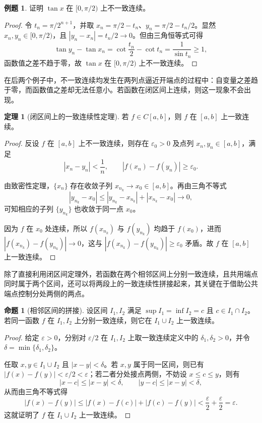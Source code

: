 \documentclass[UTF8,fontset=fandol,a4paper,12pt]{ctexart}
\theoremstyle{definition}
\newtheorem{theorem}[definition]{定理}
\newtheorem{proposition}[definition]{命题}
\newtheorem{example}[definition]{例题}
\begin{document}
\begin{example}
证明 $\tan x$ 在 $[0,\pi/2)$ 上不一致连续。
\end{example}
\begin{proof}
令 $t_n=\pi/2^{n+1}$，并取 $x_n=\pi/2-t_n$、$y_n=\pi/2-t_n/2$。显然 $x_n,y_n\in[0,\pi/2)$，且 $|y_n-x_n|=t_n/2\to0$。但由三角恒等式可得
\[
 \tan y_n-\tan x_n
 =\cot\frac{t_n}{2}-\cot t_n
 =\frac1{\sin t_n}\ge1,
\]
函数值之差不趋于零，故 $\tan x$ 在 $[0,\pi/2)$ 上不一致连续。
\end{proof}

在后两个例子中，不一致连续均发生在两列点逼近开端点的过程中：自变量之差趋于零，而函数值之差却无法任意小。若函数在闭区间上连续，则这一现象不会出现。

\begin{theorem}[闭区间上的一致连续性定理]
若 $f\in C[a,b]$，则 $f$ 在 $[a,b]$ 上一致连续。
\end{theorem}
\begin{proof}
反设 $f$ 在 $[a,b]$ 上不一致连续，则存在 $\varepsilon_0>0$ 及点列 $x_n,y_n\in[a,b]$，满足
\[
 |x_n-y_n|<\frac1n,\qquad |f(x_n)-f(y_n)|\ge\varepsilon_0.
\]

由致密性定理，$\{x_n\}$ 存在收敛子列 $x_{n_k}\to x_0\in[a,b]$。再由三角不等式
\[
 |y_{n_k}-x_0|\le|y_{n_k}-x_{n_k}|+|x_{n_k}-x_0|\to0,
\]
可知相应的子列 $\{y_{n_k}\}$ 也收敛于同一点 $x_0$。

因为 $f$ 在 $x_0$ 处连续，所以 $f(x_{n_k})$ 与 $f(y_{n_k})$ 均趋于 $f(x_0)$，进而 $|f(x_{n_k})-f(y_{n_k})|\to0$，这与 $|f(x_{n_k})-f(y_{n_k})|\ge\varepsilon_0$ 矛盾。故 $f$ 在 $[a,b]$ 上一致连续。
\end{proof}

除了直接利用闭区间定理外，若函数在两个相邻区间上分别一致连续，且共用端点同时属于两个区间，还可以将两段上的一致连续性拼接起来，其关键在于借助公共端点控制分处两侧的两点。

\begin{proposition}[相邻区间的拼接]
设区间 $I_1,I_2$ 满足 $\sup I_1=\inf I_2=c$ 且 $c\in I_1\cap I_2$。若同一函数 $f$ 在 $I_1,I_2$ 上分别一致连续，则它在 $I_1\cup I_2$ 上一致连续。
\end{proposition}
\begin{proof}
给定 $\varepsilon>0$，分别对 $\varepsilon/2$ 在 $I_1,I_2$ 上取一致连续定义中的 $\delta_1,\delta_2>0$，并令 $\delta=\min\{\delta_1,\delta_2\}$。

任取 $x,y\in I_1\cup I_2$ 且 $|x-y|<\delta$。若 $x,y$ 属于同一区间，则已有 $|f(x)-f(y)|<\varepsilon/2<\varepsilon$；若二者分处接点两侧，不妨设 $x\le c\le y$，则有
\[
 |x-c|\le|x-y|<\delta,\qquad |y-c|\le|x-y|<\delta,
\]
从而由三角不等式得
\[
 |f(x)-f(y)|\le|f(x)-f(c)|+|f(c)-f(y)|<\frac\varepsilon2+\frac\varepsilon2=\varepsilon.
\]
这就证明了 $f$ 在 $I_1\cup I_2$ 上一致连续。
\end{proof}
\end{document}
